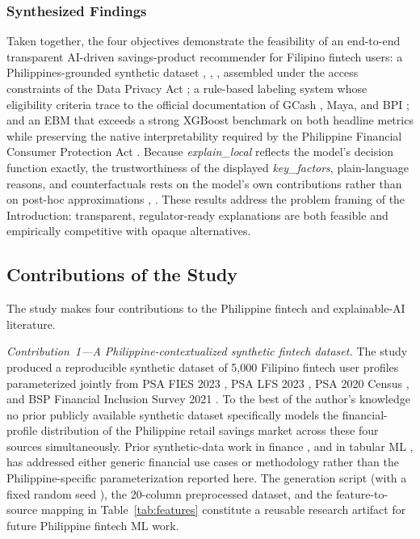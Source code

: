 \documentclass{icsthesis}
\begin{document}
\begin{mainmatter}
				\subsubsection{Synthesized Findings}
					Taken together, the four objectives demonstrate the feasibility of an end-to-end transparent AI-driven savings-product recommender for Filipino fintech users: a Philippines-grounded synthetic dataset \cite{ref35}, \cite{ref39}, \cite{ref40}, \cite{ref41} assembled under the access constraints of the Data Privacy Act \cite{ref45}; a rule-based labeling system whose eligibility criteria trace to the official documentation of GCash \cite{ref6}, Maya, and BPI \cite{ref37}; and an EBM that exceeds a strong XGBoost benchmark on both headline metrics while preserving the native interpretability required by the Philippine Financial Consumer Protection Act \cite{ref44}. Because \emph{explain\_local} reflects the model's decision function exactly, the trustworthiness of the displayed \emph{key\_factors}, plain-language reasons, and counterfactuals rests on the model's own contributions rather than on post-hoc approximations \cite{ref15}, \cite{ref48}. These results address the problem framing of the Introduction: transparent, regulator-ready explanations are both feasible and empirically competitive with opaque alternatives.

			\subsection{Contributions of the Study}
				The study makes four contributions to the Philippine fintech and explainable-AI literature.

				\textit{Contribution~1---A Philippine-contextualized synthetic fintech dataset.} The study produced a reproducible synthetic dataset of 5{,}000 Filipino fintech user profiles parameterized jointly from PSA FIES 2023 \cite{ref40}, PSA LFS 2023 \cite{ref41}, PSA 2020 Census \cite{ref39}, and BSP Financial Inclusion Survey 2021 \cite{ref35}. To the best of the author's knowledge no prior publicly available synthetic dataset specifically models the financial-profile distribution of the Philippine retail savings market across these four sources simultaneously. Prior synthetic-data work in finance \cite{ref46}, \cite{ref83} and in tabular ML \cite{ref29}, \cite{ref34} has addressed either generic financial use cases or methodology rather than the Philippine-specific parameterization reported here. The generation script (with a fixed random seed \cite{ref60}), the 20-column preprocessed dataset, and the feature-to-source mapping in Table~\ref{tab:features} constitute a reusable research artifact for future Philippine fintech ML work.


\end{mainmatter}
\end{document}
